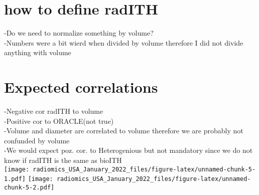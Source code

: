\documentclass[]{article}
\newenvironment{Shaded}{\begin{snugshade}}{\end{snugshade}}
\newcommand{\KeywordTok}[1]{\textcolor[rgb]{0.13,0.29,0.53}{\textbf{#1}}}
\newcommand{\DataTypeTok}[1]{\textcolor[rgb]{0.13,0.29,0.53}{#1}}
\newcommand{\DecValTok}[1]{\textcolor[rgb]{0.00,0.00,0.81}{#1}}
\newcommand{\StringTok}[1]{\textcolor[rgb]{0.31,0.60,0.02}{#1}}
\newcommand{\OtherTok}[1]{\textcolor[rgb]{0.56,0.35,0.01}{#1}}
\newcommand{\OperatorTok}[1]{\textcolor[rgb]{0.81,0.36,0.00}{\textbf{#1}}}
\newcommand{\NormalTok}[1]{#1}
\begin{document}
\section{how to define radITH}\label{how-to-define-radith}

-Do we need to normalize something by volume?\\
-Numbers were a bit wierd when divided by volume therefore I did not
divide anything with volume

\begin{Shaded}
\end{Shaded}

\section{Expected correlations}\label{expected-correlations}

-Negative cor radITH to volume\\
-Positive cor to ORACLE(not true)\\
-Volume and diameter are correlated to volume therefore we are probably
not confunded by volume\\
-We would expect poz. cor. to Heterogenious but not mandatory since we
do not know if radITH is the same as bioITH\\
\texttt{[image: radiomics\_USA\_January\_2022\_files/figure-latex/unnamed-chunk-5-1.pdf]}
\texttt{[image: radiomics\_USA\_January\_2022\_files/figure-latex/unnamed-chunk-5-2.pdf]}
\end{document}
